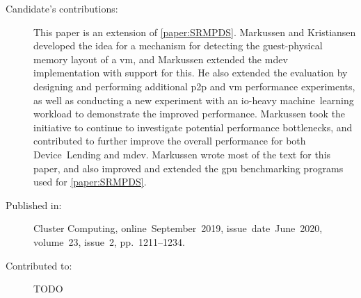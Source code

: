 \begin{description}
	\item[Candidate's contributions:]
		This paper is an extension of \cref{paper:SRMPDS}.
		Markussen and Kristiansen developed the idea for a mechanism for detecting the guest-physical memory layout of a \acrshort{vm}, and Markussen
		extended the \acrshort{mdev} implementation with support for this.
		He also extended the evaluation by designing and performing additional \acrshort{p2p} and \acrshort{vm} performance experiments,
		as well as conducting a new experiment with an \gls{io}-heavy machine~learning workload to demonstrate the improved performance.
		Markussen took the initiative to continue to investigate potential performance bottlenecks, and contributed to further improve the overall performance for both Device~Lending and \acrshort{mdev}.
		Markussen wrote most of the text for this paper, and also improved and extended the \acrshort{gpu} benchmarking programs used
		for \cref{paper:SRMPDS}.


	\item[Published in:]
		Cluster Computing,
		online~September~2019,
		issue~date~June~2020, 
		volume~23, issue~2, pp.~1211--1234.

	\item[Contributed to:]
		TODO

\end{description}
